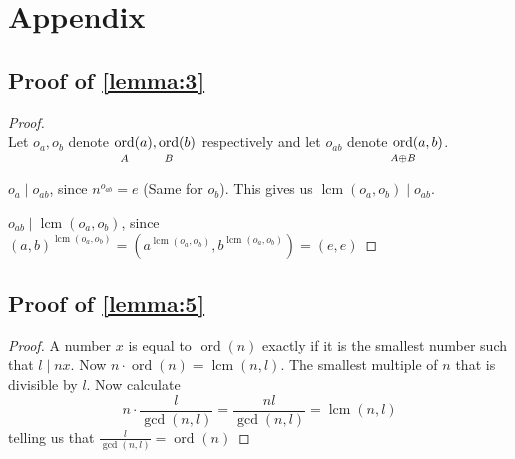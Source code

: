\documentclass{article}
\newcommand{\ordgroup}[1]{\ord_{\rule{0pt}{9pt}\mathclap{#1}}}
\DeclareMathOperator{\ordb}{ord}
\newcommand{\ord}{\mathop{\ordb}\limits}
\DeclareMathOperator{\lcm}{lcm}
\newenvironment{pg}{

}{

\medskip

}
\begin{document}
	\section{Appendix}\label{sec:appendix}
	
	\subsection{\texorpdfstring{Proof of \cref{lemma:3}}{Proof of Lemma 3}}\label{sec:proveLemmaThree}
	
	\usebox{\proveLemmaThree}
	
	\begin{proof} \rule{0pt}{0pt}\\
		Let $o_a, o_b$ denote $\ordgroup{A}(a), \ordgroup{B}(b)$ respectively and let $o_{ab}$ denote $\ordgroup{A \oplus B}(a,b)$.
		\begin{pg}
			$o_a \mid o_{ab}$, since $n^{o_{ab}} = e$ (Same for $o_b$). This gives us $\lcm(o_a, o_b) \mid o_{ab}$.
		\end{pg}
		\begin{pg}
			$o_{ab} \mid \lcm(o_a, o_b)$, since $(a,b)^{\lcm(o_a, o_b)} = (a^{\lcm(o_a, o_b)}, b^{\lcm(o_a, o_b)}) = (e,e)$
		\end{pg}
	\end{proof}
	
	\subsection{\texorpdfstring{Proof of \cref{lemma:5}}{Proof of Lemma 5}}\label{sec:proveLemmaFive}
	
	\usebox{\proveLemmaFive}
	
	\begin{proof}
		A number $x$ is equal to $\ord(n)$ exactly if it is the smallest number such that $l \mid nx$. Now $n · \ord(n) = \lcm(n, l)$. The smallest multiple of $n$ that is divisible by $l$.
		Now calculate
		\begin{equation*}
			n · \frac{l}{\gcd(n,l)} = \frac{nl}{\gcd(n,l)} = \lcm(n,l)
		\end{equation*}
		telling us that $\frac{l}{\gcd(n,l)} = \ord(n)$
	\end{proof}
	
	\printbibliography
\end{document}
